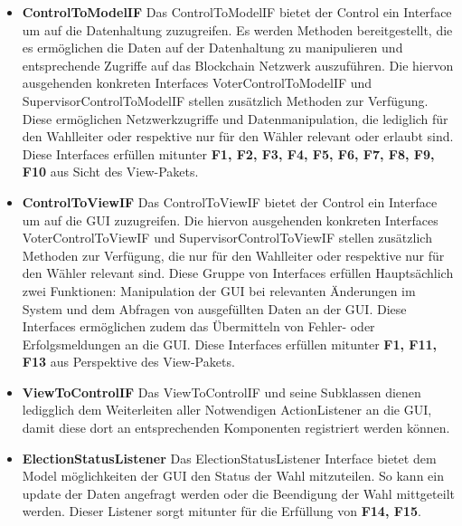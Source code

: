 \documentclass[parskip=full]{scrartcl}
\newcommand{\fakeparagraph}[1]{\textbf{#1}}
\begin{document}
	\begin{itemize}
	\item\fakeparagraph{ControlToModelIF} Das ControlToModelIF bietet der Control ein Interface um auf die Datenhaltung zuzugreifen.
	Es werden Methoden bereitgestellt, die es ermöglichen die Daten auf der Datenhaltung zu manipulieren und entsprechende Zugriffe auf das Blockchain Netzwerk auszuführen.
	Die hiervon ausgehenden konkreten Interfaces VoterControlToModelIF und SupervisorControlToModelIF stellen zusätzlich Methoden zur Verfügung. Diese ermöglichen Netzwerkzugriffe und Datenmanipulation, die lediglich für den Wahlleiter oder respektive nur für den Wähler relevant oder erlaubt sind.
	Diese Interfaces erfüllen mitunter \textbf{F1, F2, F3, F4, F5, F6, F7, F8, F9, F10} aus Sicht des View-Pakets.
	\end{itemize} 

	\begin{itemize}
	\item\fakeparagraph{ControlToViewIF} Das ControlToViewIF bietet der Control ein Interface um auf die GUI zuzugreifen.
	Die hiervon ausgehenden konkreten Interfaces VoterControlToViewIF und SupervisorControlToViewIF stellen zusätzlich Methoden zur Verfügung, die nur für den Wahlleiter oder respektive nur für den Wähler relevant sind. 
	Diese Gruppe von Interfaces erfüllen Hauptsächlich zwei Funktionen: Manipulation der GUI bei relevanten Änderungen im System und dem Abfragen von ausgefüllten Daten an der GUI.
	Diese Interfaces ermöglichen zudem das Übermitteln von Fehler- oder Erfolgsmeldungen an die GUI.
	Diese Interfaces erfüllen mitunter \textbf{F1, F11, F13} aus Perspektive des View-Pakets.
	\end{itemize} 
	\begin{itemize}
	\item\fakeparagraph{ViewToControlIF} Das ViewToControlIF und seine Subklassen dienen ledigglich dem Weiterleiten aller Notwendigen ActionListener an die GUI, damit diese dort an entsprechenden Komponenten registriert werden können.
	\end{itemize} 
	\begin{itemize}
	\item\fakeparagraph{ElectionStatusListener} Das ElectionStatusListener Interface bietet dem Model möglichkeiten der GUI den Status der Wahl mitzuteilen. So kann ein update der Daten angefragt werden oder die Beendigung der Wahl mittgeteilt werden.
	Dieser Listener sorgt mitunter für die Erfüllung von \textbf{F14, F15}.
	\end{itemize} 
  
\end{document}
